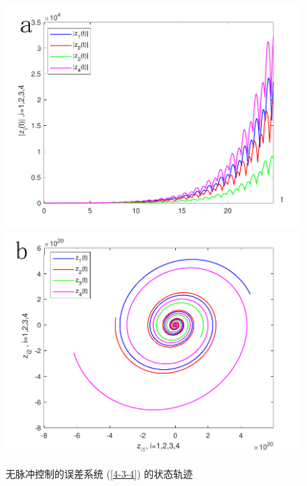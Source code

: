 \begin{figure}[!bp]
    \centering
    \includegraphics[scale=0.5]{./ch4/fig4-9-1.pdf}
    \includegraphics[scale=0.5]{./ch4/fig4-9-2.pdf}  
    \caption{无脉冲控制的误差系统 (\ref{4-3-4}) 的状态轨迹 }
    \label{f4-9}
\end{figure}

